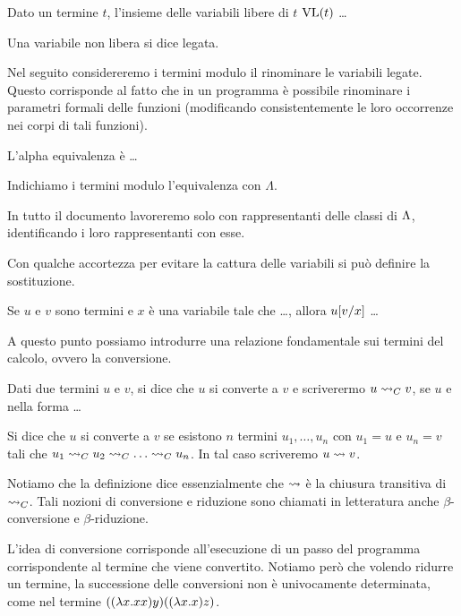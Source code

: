 \documentclass[]{marticle}
\begin{document}
\begin{block}[Definizione]
    Dato un termine $t$, l'insieme delle variabili libere di $t$ $\text{VL}(t)$ \dots

    Una variabile non libera si dice legata.
\end{block}

Nel seguito considereremo i termini modulo il rinominare le variabili legate.
Questo corrisponde al fatto che in un programma \`e possibile rinominare i
parametri formali delle funzioni (modificando consistentemente le loro
occorrenze nei corpi di tali funzioni).

\begin{block}[Definizione]
    L'alpha equivalenza \`e \dots

    Indichiamo i termini modulo l'equivalenza con $\Lambda$.
\end{block}

In tutto il documento lavoreremo solo con rappresentanti delle classi di $\Lambda$,
identificando i loro rappresentanti con esse.

Con qualche accortezza per evitare la cattura delle variabili si pu\`o definire
la sostituzione.

\begin{block}[Definizione]
    Se $u$ e $v$ sono termini e $x$ \`e una variabile tale che \dots, allora
    $u [v/x]$ \dots
\end{block}

A questo punto possiamo introdurre una relazione fondamentale sui termini del
calcolo, ovvero la conversione.

\begin{block}[Definizione]
    Dati due termini $u$ e $v$, si dice che $u$ si converte a $v$ e scriverermo
    $u \rightsquigarrow_C v$, se $u$ e nella forma \dots

    Si dice che $u$ si converte a $v$ se esistono $n$ termini $u_1, \dots, u_n$
    con $u_1 = u$ e $u_n = v$ tali che $u_1 \conv_C u_2 \conv_C \dots \conv_C
    u_n$. In tal caso scriveremo $u\rightsquigarrow v$.
\end{block}

Notiamo che la definizione dice essenzialmente che $\rightsquigarrow$ \`e la chiusura
transitiva di $\rightsquigarrow_C$. Tali nozioni di conversione e riduzione sono chiamati
in letteratura anche $\beta$-conversione e $\beta$-riduzione.

L'idea di conversione corrisponde all'esecuzione di un passo del programma
corrispondente al termine che viene convertito. Notiamo per\`o che volendo
ridurre un termine, la successione delle conversioni non \`e univocamente
determinata, come nel termine $((\lambda x .xx)y)((\lambda x.x)z)$.
\end{document}
